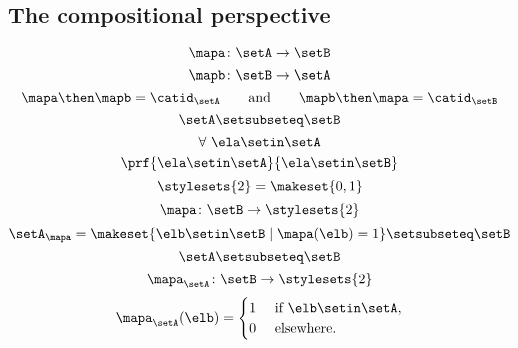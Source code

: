 \begin{forslides}
\subsection{The compositional perspective}

\begin{equation}\label{eq:slides_session2_173}
\mapa\colon \setA \to \setB
\end{equation}
\begin{equation}\label{eq:slides_session2_174}
\mapb \colon \setB \to \setA
\end{equation}
\begin{equation}\label{eq:slides_session2_175}
\mapa \then \mapb = \catid_\setA \qquad \text{and}  \qquad \mapb \then \mapa = \catid_\setB
\end{equation}
\begin{equation}\label{eq:slides_session2_176}
\setA \setsubseteq \setB
\end{equation}
\begin{equation}\label{eq:slides_session2_177}
\forall \ \ela \setin\setA
\end{equation}
\begin{equation}\label{eq:slides_session2_178}
 \prf{
        \ela \setin\setA
    }{
        \ela \setin\setB
    }
\end{equation}
\begin{equation}\label{eq:slides_session2_179}
\stylesets{2} = \makeset{ 0, 1}
\end{equation}
\begin{equation}\label{eq:slides_session2_180}
\mapa \colon \setB \to \stylesets{2}
\end{equation}
\begin{equation}\label{eq:slides_session2_181}
\setA_\mapa = \makeset{ \elb \setin\setB \mid \mapa(\elb) = 1 } \setsubseteq \setB
\end{equation}
\begin{equation}\label{eq:slides_session2_182}
\setA \setsubseteq \setB
\end{equation}
\begin{equation}\label{eq:slides_session2_183}
\mapa_\setA \colon \setB \to \stylesets{2}
\end{equation}
\begin{equation}\label{eq:slides_session2_184}
\mapa_\setA(\elb) = \begin{cases}
        1 & \text{ if }\elb\setin\setA, \\
        0 & \text{ elsewhere}.
    \end{cases}

\end{equation}
\end{forslides}
